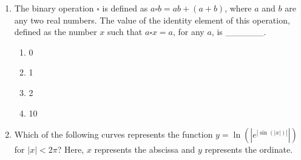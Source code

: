 \documentclass[journal,12pt,onecolumn]{IEEEtran}
\begin{document}
\begin{enumerate}
\item The binary operation $\square$ is defined as $a \square b = ab + (a + b)$, where $a$ and $b$ are any two real numbers. The value of the identity element of this operation, defined as the number $x$ such that $a \square x = a$, for any $a$, is \_\_\_\_\_\_.

\hfill{}

\begin{multicols}{4}
\begin{enumerate}
\item 0
\item 1
\item 2
\item 10
\end{enumerate}
\end{multicols}

\newpage



\item Which of the following curves represents the function 
$y = \ln\!\left(|e^{|\sin(|x|)|}|\right)$ for $|x| < 2\pi$? 
Here, $x$ represents the abscissa and $y$ represents the ordinate.


\hfill{}



\end{enumerate}
\end{document}
